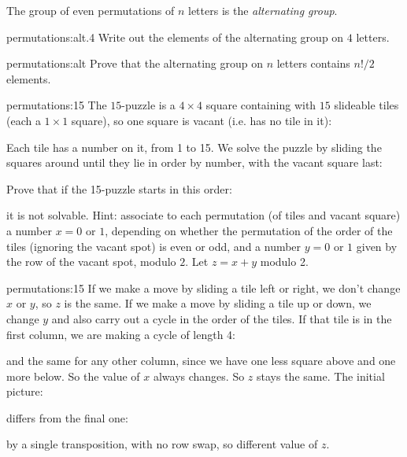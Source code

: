 The group of even permutations of \(n\) letters is the \emph{alternating group}.
\begin{problem}{permutations:alt.4}
Write out the elements of the alternating group on \(4\) letters.
\end{problem}
\begin{problem}{permutations:alt}
Prove that the alternating group on \(n\) letters contains \(n!/2\) elements.
\end{problem}
\begin{problem}{permutations:15}
The \(15\)-puzzle is a \(4 \times 4\) square containing with \(15\) slideable tiles (each a \(1 \times 1\) square), so one square is vacant (i.e. has no tile in it):
\begin{center}

\end{center}
Each tile has a number on it, from 1 to 15.
We solve the puzzle by sliding the squares around until they lie in order by number, with the vacant square last:
\begin{center}

\end{center}
Prove that if the 15-puzzle starts in this order:
\begin{center}

\end{center}
it is not solvable.
Hint: associate to each permutation (of tiles and vacant square) a number \(x=0\) or \(1\), depending on whether the permutation of the order of the tiles (ignoring the vacant spot) is even or odd, and a number \(y=0\) or \(1\) given by the row of the vacant spot, modulo \(2\).
Let \(z=x+y\) modulo 2.
\end{problem}
\begin{answer}{permutations:15}
If we make a move by sliding a tile left or right, we don't change \(x\) or \(y\), so \(z\) is the same.
If we make a move by sliding a tile up or down, we change \(y\) and also carry out a cycle in the order of the tiles.
If that tile is in the first column, we are making a cycle of length 4:
\begin{center}

\end{center}
and the same for any other column, since we have one less square above and one more below.
So the value of \(x\) always changes.
So \(z\) stays the same.
The initial picture:
\begin{center}

\end{center}
differs from the final one:
\begin{center}

\end{center}
by a single transposition, with no row swap, so different value of \(z\).
\end{answer}

